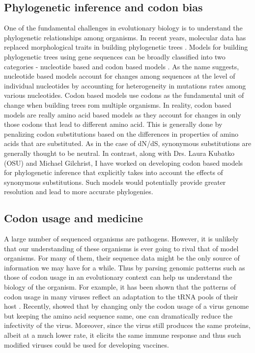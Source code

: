 \subsection{Phylogenetic inference and codon bias}
One of the fundamental challenges in evolutionary biology is to understand the phylogenetic relationships among organisms.
In recent years, molecular data has replaced morphological traits in building phylogenetic trees \citep{JukesAndCantor69,Fink86,PosadaAndCrandall98}.
Models for building phylogenetic trees using gene sequences can be broadly classified into two categories - nucleotide based and codon based models \citep{GoldmanAndYang94}.
As the name suggests, nucleotide based models account for changes among sequences at the level of individual nucleotides by accounting for heterogeneity in mutations rates among various nucleotides.
Codon based models use codons as the fundamental unit of change when building trees rom multiple organisms.
In reality, codon based models are really amino acid based models as they account for changes in only those codons that lead to different amino acid.
This is generally done by penalizing codon substitutions based on the differences in properties of amino acids that are substituted.
As in the case of dN/dS, synonymous substitutions are generally thought to be neutral.
In contrast, along with Drs. Laura Kubatko (OSU) and Michael Gilchrist, I have worked on developing codon based models for phylogenetic inference that explicitly takes into account the effects of synonymous substitutions.
Such models would potentially provide greater resolution and lead to more accurate phylogenies.

\subsection{Codon usage and medicine}
A large number of sequenced organisms are pathogens.%
However, it is unlikely that our understanding of these organisms is ever going to rival that of model organisms.
For many of them, their sequence data might be the only source of information we may have for a while.
Thus by parsing genomic patterns such as those of codon usage in an evolutionary context can help us understand the biology of the organism.
For example, it has been shown that the patterns of codon usage in many viruses reflect an adaptation to the tRNA pools of their host \citep{ZhouEtAl99,PlotkinAndDushoff03,GroteEtAl05,ColemanEtAl08}.
Recently, \citep{ColemanEtAl08} showed that by changing only the codon usage of a virus genome but keeping the amino acid sequence same, one can dramatically reduce the infectivity of the virus.
Moreover, since the virus still produces the same proteins, albeit at a much lower rate, it elicits the same immune response and thus such modified viruses could be used for developing vaccines.



